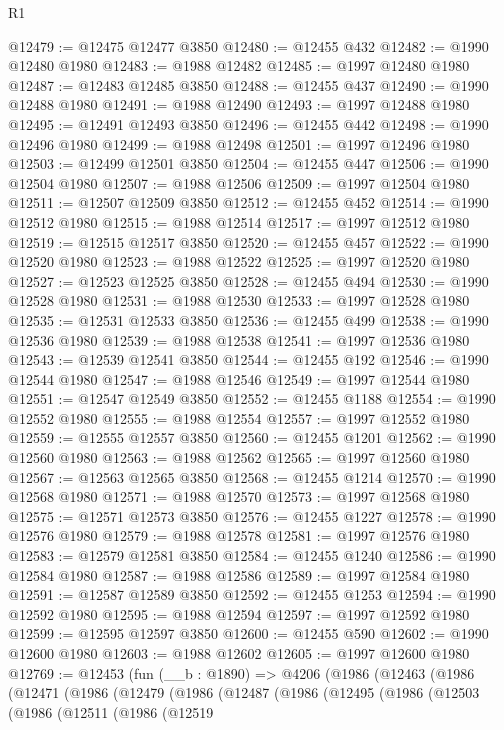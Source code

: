 \begin{lexlean}{R1}
\begin{coremodule}
@12479 := @12475 @12477 @3850
@12480 := @12455 @432
@12482 := @1990 @12480 @1980
@12483 := @1988 @12482
@12485 := @1997 @12480 @1980
@12487 := @12483 @12485 @3850
@12488 := @12455 @437
@12490 := @1990 @12488 @1980
@12491 := @1988 @12490
@12493 := @1997 @12488 @1980
@12495 := @12491 @12493 @3850
@12496 := @12455 @442
@12498 := @1990 @12496 @1980
@12499 := @1988 @12498
@12501 := @1997 @12496 @1980
@12503 := @12499 @12501 @3850
@12504 := @12455 @447
@12506 := @1990 @12504 @1980
@12507 := @1988 @12506
@12509 := @1997 @12504 @1980
@12511 := @12507 @12509 @3850
@12512 := @12455 @452
@12514 := @1990 @12512 @1980
@12515 := @1988 @12514
@12517 := @1997 @12512 @1980
@12519 := @12515 @12517 @3850
@12520 := @12455 @457
@12522 := @1990 @12520 @1980
@12523 := @1988 @12522
@12525 := @1997 @12520 @1980
@12527 := @12523 @12525 @3850
@12528 := @12455 @494
@12530 := @1990 @12528 @1980
@12531 := @1988 @12530
@12533 := @1997 @12528 @1980
@12535 := @12531 @12533 @3850
@12536 := @12455 @499
@12538 := @1990 @12536 @1980
@12539 := @1988 @12538
@12541 := @1997 @12536 @1980
@12543 := @12539 @12541 @3850
@12544 := @12455 @192
@12546 := @1990 @12544 @1980
@12547 := @1988 @12546
@12549 := @1997 @12544 @1980
@12551 := @12547 @12549 @3850
@12552 := @12455 @1188
@12554 := @1990 @12552 @1980
@12555 := @1988 @12554
@12557 := @1997 @12552 @1980
@12559 := @12555 @12557 @3850
@12560 := @12455 @1201
@12562 := @1990 @12560 @1980
@12563 := @1988 @12562
@12565 := @1997 @12560 @1980
@12567 := @12563 @12565 @3850
@12568 := @12455 @1214
@12570 := @1990 @12568 @1980
@12571 := @1988 @12570
@12573 := @1997 @12568 @1980
@12575 := @12571 @12573 @3850
@12576 := @12455 @1227
@12578 := @1990 @12576 @1980
@12579 := @1988 @12578
@12581 := @1997 @12576 @1980
@12583 := @12579 @12581 @3850
@12584 := @12455 @1240
@12586 := @1990 @12584 @1980
@12587 := @1988 @12586
@12589 := @1997 @12584 @1980
@12591 := @12587 @12589 @3850
@12592 := @12455 @1253
@12594 := @1990 @12592 @1980
@12595 := @1988 @12594
@12597 := @1997 @12592 @1980
@12599 := @12595 @12597 @3850
@12600 := @12455 @590
@12602 := @1990 @12600 @1980
@12603 := @1988 @12602
@12605 := @1997 @12600 @1980
@12769 := @12453
    (fun (__b : @1890) =>
    @4206
      (@1986
        (@12463
          (@1986
            (@12471
              (@1986
                (@12479
                  (@1986
                    (@12487
                      (@1986
                        (@12495
                          (@1986
                            (@12503
                              (@1986
                                (@12511
                                  (@1986
                                    (@12519

\end{coremodule}
\end{lexlean}
